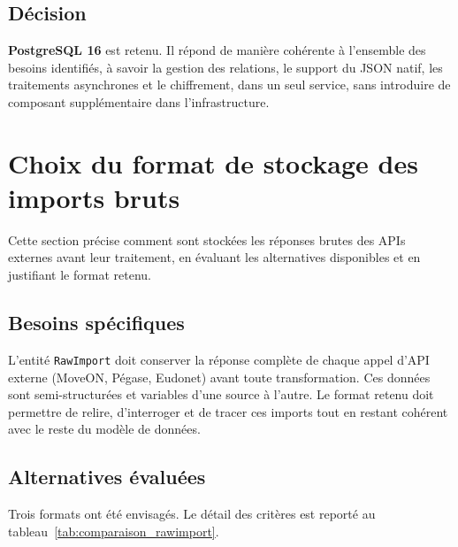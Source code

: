 \subsection{Décision}

\textbf{PostgreSQL 16} est retenu. Il répond de manière cohérente à l'ensemble
des besoins identifiés, à savoir la gestion des relations, le support du JSON natif,
les traitements asynchrones et le chiffrement, dans un seul service, sans introduire
de composant supplémentaire dans l'infrastructure.

\section{Choix du format de stockage des imports bruts}

Cette section précise comment sont stockées les réponses brutes des APIs
externes avant leur traitement, en évaluant les alternatives disponibles
et en justifiant le format retenu.

\subsection{Besoins spécifiques}

L'entité \texttt{RawImport} doit conserver la réponse complète de chaque
appel d'API externe (MoveON, Pégase, Eudonet) avant toute transformation.
Ces données sont semi-structurées et variables d'une source à l'autre.
Le format retenu doit permettre de relire, d'interroger et de tracer ces
imports tout en restant cohérent avec le reste du modèle de données.

\subsection{Alternatives évaluées}

Trois formats ont été envisagés. Le détail des critères est reporté au tableau~\ref{tab:comparaison_rawimport}.

